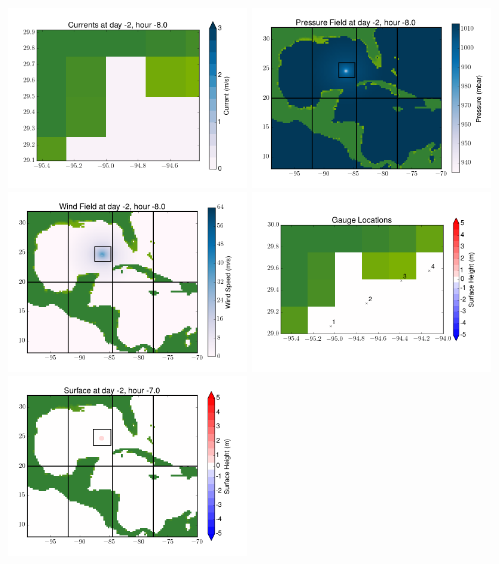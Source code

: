 \documentclass[11pt]{article}
\begin{document}
\vskip 10pt 
\includegraphics[width=0.475\textwidth]{frame0016fig7.png}
\includegraphics[width=0.475\textwidth]{frame0016fig8.png}
\vskip 10pt 
\includegraphics[width=0.475\textwidth]{frame0016fig9.png}
\includegraphics[width=0.475\textwidth]{frame0016fig10.png}
\vskip 10pt 
\includegraphics[width=0.475\textwidth]{frame0017fig1.png}
\end{document}
